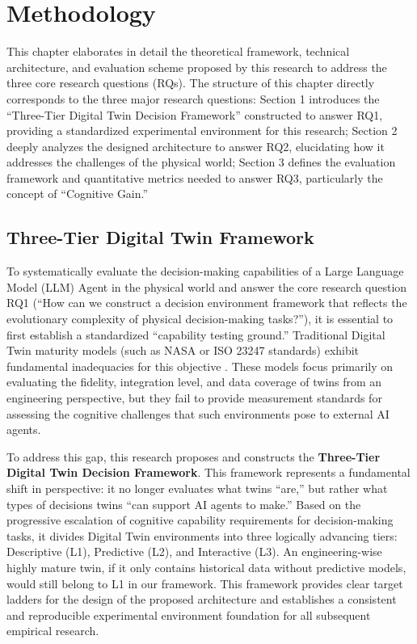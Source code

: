 
\chapter{Methodology} \label{chp:methodology}

This chapter elaborates in detail the theoretical framework, technical architecture, and evaluation scheme proposed by this research to address the three core research questions (RQs). The structure of this chapter directly corresponds to the three major research questions: Section 1 introduces the ``Three-Tier Digital Twin Decision Framework'' constructed to answer RQ1, providing a standardized experimental environment for this research; Section 2 deeply analyzes the designed architecture to answer RQ2, elucidating how it addresses the challenges of the physical world; Section 3 defines the evaluation framework and quantitative metrics needed to answer RQ3, particularly the concept of ``Cognitive Gain.''

\section{Three-Tier Digital Twin Framework}

To systematically evaluate the decision-making capabilities of a Large Language Model (LLM) Agent in the physical world and answer the core research question RQ1 (``How can we construct a decision environment framework that reflects the evolutionary complexity of physical decision-making tasks?''), it is essential to first establish a standardized ``capability testing ground.'' Traditional Digital Twin maturity models (such as NASA or ISO 23247 standards) exhibit fundamental inadequacies for this objective \cite{glaessgen2012digital, iso23247}. These models focus primarily on evaluating the fidelity, integration level, and data coverage of twins from an engineering perspective, but they fail to provide measurement standards for assessing the cognitive challenges that such environments pose to external AI agents.

To address this gap, this research proposes and constructs the \textbf{Three-Tier Digital Twin Decision Framework}. This framework represents a fundamental shift in perspective: it no longer evaluates what twins ``are,'' but rather what types of decisions twins ``can support AI agents to make.'' Based on the progressive escalation of cognitive capability requirements for decision-making tasks, it divides Digital Twin environments into three logically advancing tiers: Descriptive (L1), Predictive (L2), and Interactive (L3). An engineering-wise highly mature twin, if it only contains historical data without predictive models, would still belong to L1 in our framework. This framework provides clear target ladders for the design of the proposed architecture and establishes a consistent and reproducible experimental environment foundation for all subsequent empirical research.

